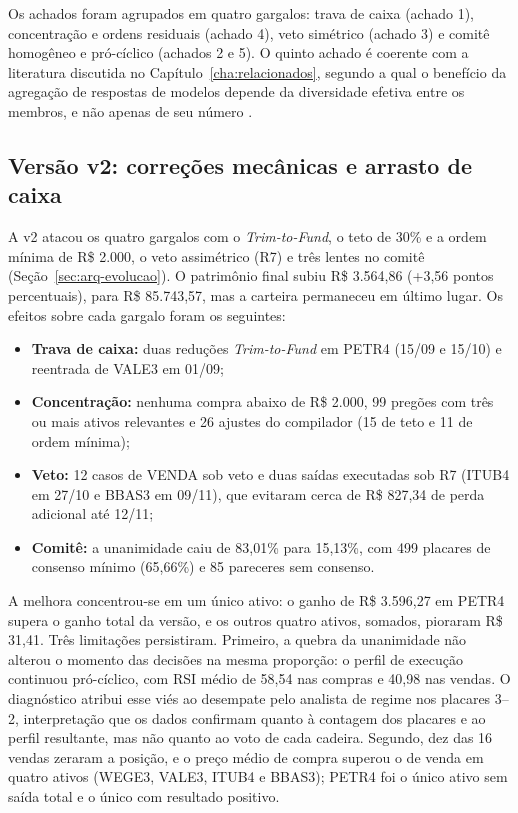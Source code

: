 \documentclass{eic-bcc-tcc}
\begin{document}
Os achados foram agrupados em quatro gargalos: trava de caixa (achado 1), concentração e ordens residuais (achado 4), veto simétrico (achado 3) e comitê homogêneo e pró-cíclico (achados 2 e 5). O quinto achado é coerente com a literatura discutida no Capítulo~\ref{cha:relacionados}, segundo a qual o benefício da agregação de respostas de modelos depende da diversidade efetiva entre os membros, e não apenas de seu número \citep{Wang2023, Smit2024}.

\subsection{Versão v2: correções mecânicas e arrasto de caixa}
\label{sec:res-v2}

A v2 atacou os quatro gargalos com o \textit{Trim-to-Fund}, o teto de 30\% e a ordem mínima de R\$ 2.000, o veto assimétrico (R7) e três lentes no comitê (Seção~\ref{sec:arq-evolucao}). O patrimônio final subiu R\$ 3.564,86 (+3,56 pontos percentuais), para R\$ 85.743,57, mas a carteira permaneceu em último lugar. Os efeitos sobre cada gargalo foram os seguintes:

\begin{itemize}
    \item \textbf{Trava de caixa:} duas reduções \textit{Trim-to-Fund} em PETR4 (15/09 e 15/10) e reentrada de VALE3 em 01/09;
    \item \textbf{Concentração:} nenhuma compra abaixo de R\$ 2.000, 99 pregões com três ou mais ativos relevantes e 26 ajustes do compilador (15 de teto e 11 de ordem mínima);
    \item \textbf{Veto:} 12 casos de VENDA sob veto e duas saídas executadas sob R7 (ITUB4 em 27/10 e BBAS3 em 09/11), que evitaram cerca de R\$ 827,34 de perda adicional até 12/11;
    \item \textbf{Comitê:} a unanimidade caiu de 83,01\% para 15,13\%, com 499 placares de consenso mínimo (65,66\%) e 85 pareceres sem consenso.
\end{itemize}

A melhora concentrou-se em um único ativo: o ganho de R\$ 3.596,27 em PETR4 supera o ganho total da versão, e os outros quatro ativos, somados, pioraram R\$ 31,41. Três limitações persistiram. Primeiro, a quebra da unanimidade não alterou o momento das decisões na mesma proporção: o perfil de execução continuou pró-cíclico, com RSI médio de 58,54 nas compras e 40,98 nas vendas. O diagnóstico atribui esse viés ao desempate pelo analista de regime nos placares 3--2, interpretação que os dados confirmam quanto à contagem dos placares e ao perfil resultante, mas não quanto ao voto de cada cadeira. Segundo, dez das 16 vendas zeraram a posição, e o preço médio de compra superou o de venda em quatro ativos (WEGE3, VALE3, ITUB4 e BBAS3); PETR4 foi o único ativo sem saída total e o único com resultado positivo.
\end{document}
